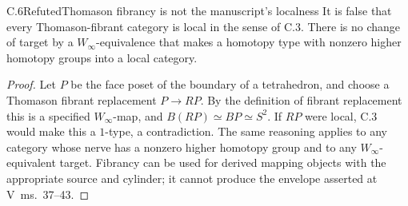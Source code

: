 \begin{claim}{C.6}{Refuted}{Thomason fibrancy is not the manuscript's localness}
It is false that every Thomason-fibrant category is local in the sense
of C.3.  There is no change of target by a $W_\infty$-equivalence that
makes a homotopy type with nonzero higher homotopy groups into a local
category.
\end{claim}
\begin{proof}
Let $P$ be the face poset of the boundary of a tetrahedron, and choose
a Thomason fibrant replacement $P\to RP$.  By the definition of
fibrant replacement this is a specified $W_\infty$-map, and
$B(RP)\simeq BP\simeq S^2$.  If $RP$ were local, C.3 would make this
a $1$-type, a contradiction.  The same reasoning applies to any
category whose nerve has a nonzero higher homotopy group and to any
$W_\infty$-equivalent target.  Fibrancy can be used for derived
mapping objects with the appropriate source and cylinder; it cannot
produce the envelope asserted at V~ms.~37--43.
\end{proof}
